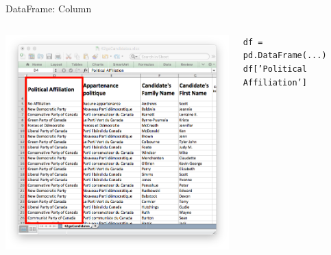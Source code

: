 \documentclass{beamer}
\begin{document}
\begin{frame}{DataFrame: Column}
    \begin{columns}
        \begin{column}{0.5\textwidth}
            \includegraphics[width=\textwidth]{img/data-frame-column.png}
        \end{column}
        \begin{column}{0.5\textwidth}
        \footnotesize
        \texttt{df = pd.DataFrame(...)}
        \texttt{df['Political Affiliation']}
        \end{column}
    \end{columns}
\end{frame}
\end{document}

